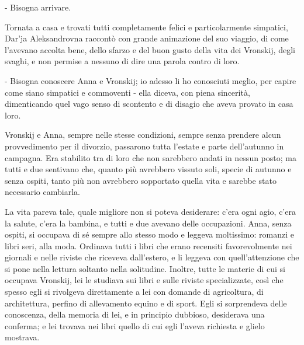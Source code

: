 - Bisogna arrivare. 

Tornata a casa e trovati tutti completamente felici e particolarmente simpatici, Dar'ja Aleksandrovna raccontò con grande animazione del suo viaggio, di come l'avevano accolta bene, dello sfarzo e del buon gusto della vita dei Vronskij, degli svaghi, e non permise a nessuno di dire una parola contro di loro. 

- Bisogna conoscere Anna e Vronskij; io adesso li ho conosciuti meglio, per capire come siano simpatici e commoventi - ella diceva, con piena sincerità, dimenticando quel vago senso di scontento e di disagio che aveva provato in casa loro. 

\label{xxv-4} 

Vronskij e Anna, sempre nelle stesse condizioni, sempre senza prendere alcun provvedimento per il divorzio, passarono tutta l'estate e parte dell'autunno in campagna. Era stabilito tra di loro che non sarebbero andati in nessun posto; ma tutti e due sentivano che, quanto più avrebbero vissuto soli, specie di autunno e senza ospiti, tanto più non avrebbero sopportato quella vita e sarebbe stato necessario cambiarla. 

La vita pareva tale, quale migliore non si poteva desiderare: c'era ogni agio, c'era la salute, c'era la bambina, e tutti e due avevano delle occupazioni. Anna, senza ospiti, si occupava di sé sempre allo stesso modo e leggeva moltissimo: romanzi e libri seri, alla moda. Ordinava tutti i libri che erano recensiti favorevolmente nei giornali e nelle riviste che riceveva dall'estero, e li leggeva con quell'attenzione che si pone nella lettura soltanto nella solitudine. Inoltre, tutte le materie di cui si occupava Vronskij, lei le studiava sui libri e sulle riviste specializzate, così che spesso egli si rivolgeva direttamente a lei con domande di agricoltura, di architettura, perfino di allevamento equino e di sport. Egli si sorprendeva delle conoscenza, della memoria di lei, e in principio dubbioso, desiderava una conferma; e lei trovava nei libri quello di cui egli l'aveva richiesta e glielo mostrava. 

